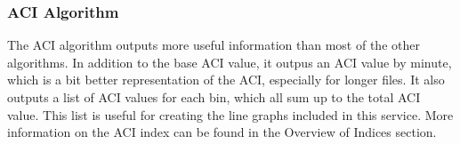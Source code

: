 \subsubsection{ACI Algorithm}
The ACI algorithm outputs more useful information than most of the other algorithms. In addition to the base ACI value, it outpus an ACI value by minute, which is a bit better representation of the ACI, especially for longer files. It also outputs a list of ACI values for each bin, which all sum up to the total ACI value. This list is useful for creating the line graphs included in this service. More information on the ACI index can be found in the Overview of Indices section.
